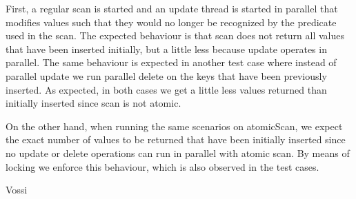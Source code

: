 \documentclass[12pt,a4paper]{article}
\begin{document}
\begin{itemize}
First, a regular scan is started and an update thread is started in parallel that modifies values such that they would no longer be recognized by the predicate used in the scan. The expected behaviour is that scan does not return all values that have been inserted initially, but a little less because update operates in parallel. The same behaviour is expected in another test case where instead of parallel update we run parallel delete on the keys that have been previously inserted. As expected, in both cases we get a little less values returned than initially inserted since scan is not atomic.

On the other hand, when running the same scenarios on atomicScan, we expect the exact number of values to be returned that have been initially inserted since no update or delete operations can run in parallel with atomic scan. By means of locking we enforce this behaviour, which is also observed in the test cases.
\end{itemize}


Vossi
\end{document}
